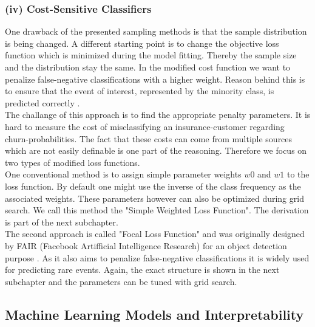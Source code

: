\documentclass[12pt,titlepage]{article}
\begin{document}
\subsubsection*{(iv) Cost-Sensitive Classifiers} \label{Cost-Sensitive Classifiers}
One drawback of the presented sampling methods is that the sample distribution is being changed. A different starting point is to change the objective loss function which is minimized during the model fitting. Thereby the sample size and the distribution stay the same. In the modified cost function we want to penalize false-negative
classifications with a higher weight. Reason behind this is to ensure that the event of interest, represented by the minority class, is predicted correctly \cite{cost_sensitive}. \\
The challange of this approach is to find the appropriate penalty parameters. It is hard to measure the cost of misclassifying an insurance-customer regarding churn-probabilities. The fact that these costs can come from multiple sources which are not easily definable is one part of the reasoning. Therefore we focus on two types of modified loss functions.\\
One conventional method is to assign simple parameter weights $w0$ and $w1$ to the loss function. By default one might use the inverse of the class frequency as the associated weights. These parameters however can also be optimized during grid search. We call this method the "Simple Weighted Loss Function". The derivation is part of the next subchapter.\\
The second approach is called "Focal Loss Function" and was originally designed by FAIR (Facebook Artifficial Intelligence Research) for an object detection purpose \cite{focal}. As it also aims to penalize false-negative classifications it is widely used for predicting rare events. Again, the exact structure is shown in the next subchapter and the parameters can be tuned with grid search.\\


\subsection{Machine Learning Models and Interpretability} \par
\end{document}
